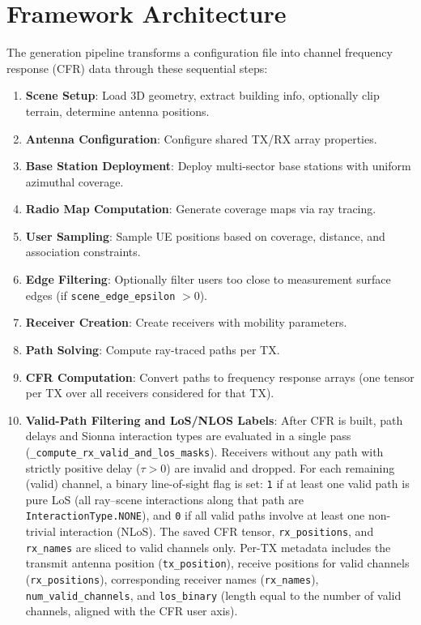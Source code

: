 \documentclass{article}
\begin{document}
\clearpage
\section{Framework Architecture}

The generation pipeline transforms a configuration file into channel frequency response (CFR) data through these sequential steps:

\begin{enumerate}
  \item \textbf{Scene Setup}: Load 3D geometry, extract building info, optionally clip terrain, determine antenna positions.
  \item \textbf{Antenna Configuration}: Configure shared TX/RX array properties.
  \item \textbf{Base Station Deployment}: Deploy multi-sector base stations with uniform azimuthal coverage.
  \item \textbf{Radio Map Computation}: Generate coverage maps via ray tracing.
  \item \textbf{User Sampling}: Sample UE positions based on coverage, distance, and association constraints.
  \item \textbf{Edge Filtering}: Optionally filter users too close to measurement surface edges (if \texttt{scene\_edge\_epsilon} $> 0$).
  \item \textbf{Receiver Creation}: Create receivers with mobility parameters.
  \item \textbf{Path Solving}: Compute ray-traced paths per TX.
  \item \textbf{CFR Computation}: Convert paths to frequency response arrays (one tensor per TX over all receivers considered for that TX).
  \item \textbf{Valid-Path Filtering and LoS/NLOS Labels}: After CFR is built, path delays and Sionna interaction types are evaluated in a single pass (\texttt{\_compute\_rx\_valid\_and\_los\_masks}). Receivers without any path with strictly positive delay ($\tau > 0$) are invalid and dropped. For each remaining (valid) channel, a binary line-of-sight flag is set: \texttt{1} if at least one valid path is pure LoS (all ray--scene interactions along that path are \texttt{InteractionType.NONE}), and \texttt{0} if all valid paths involve at least one non-trivial interaction (NLoS). The saved CFR tensor, \texttt{rx\_positions}, and \texttt{rx\_names} are sliced to valid channels only. Per-TX metadata includes the transmit antenna position (\texttt{tx\_position}), receive positions for valid channels (\texttt{rx\_positions}), corresponding receiver names (\texttt{rx\_names}), \texttt{num\_valid\_channels}, and \texttt{los\_binary} (length equal to the number of valid channels, aligned with the CFR user axis).
\end{enumerate}
\end{document}
